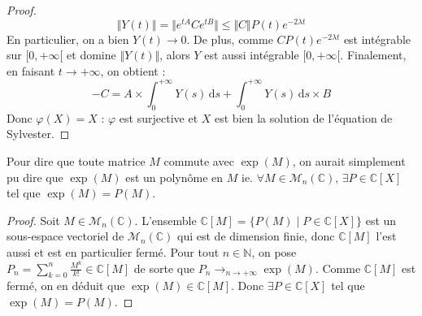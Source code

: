 \begin{proof}
    \[ \Vert Y(t) \Vert = \Vert e^{tA} C e^{tB} \Vert \leq \Vert C \Vert P(t) e^{-2 \lambda t} \]
    En particulier, on a bien $Y(t) \longrightarrow 0$. De plus, comme $C P(t) e^{-2 \lambda t}$ est intégrable sur $[0, +\infty[$ et domine $\Vert Y(t) \Vert$, alors $Y$ est aussi intégrable $[0, +\infty[$. Finalement, en faisant $t \longrightarrow +\infty$, on obtient :
    \[ -C = A \times \int_{0}^{+\infty} Y(s) \, \mathrm{d}s + \int_{0}^{+\infty} Y(s) \, \mathrm{d}s \times B \]
    Donc $\varphi(X) = X$ : $\varphi$ est surjective et $X$ est bien la solution de l'équation de Sylvester.
  \end{proof}
  
  
  \begin{remark}
    Pour dire que toute matrice $M$ commute avec $\exp(M)$, on aurait simplement pu dire que $\exp(M)$ est un polynôme en $M$ ie. $\forall M \in \mathcal{M}_n(\mathbb{C})$, $\exists P \in \mathbb{C}[X]$ tel que $\exp(M) = P(M)$.
  \end{remark}
  
  \begin{proof}
    Soit $M \in \mathcal{M}_n(\mathbb{C})$. L'ensemble $\mathbb{C}[M] = \{ P(M) \mid P \in \mathbb{C}[X] \}$ est un sous-espace vectoriel de $\mathcal{M}_n(\mathbb{C})$ qui est de dimension finie, donc $\mathbb{C}[M]$ l'est aussi et est en particulier fermé.
    \newpar
    Pour tout $n \in \mathbb{N}$, on pose $P_n = \sum_{k=0}^n \frac{M^k}{k!} \in \mathbb{C}[M]$ de sorte que $P_n \longrightarrow_{n \rightarrow +\infty} \exp(M)$. Comme $\mathbb{C}[M]$ est fermé, on en déduit que $\exp(M) \in \mathbb{C}[M]$. Donc $\exists P \in \mathbb{C}[X]$ tel que $\exp(M) = P(M)$.
  \end{proof}
